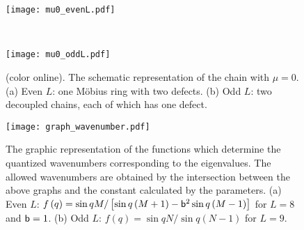 \documentclass[aps, prb, showpacs, twocolumn, %
amssymb,superscriptaddress]{revtex4}
\begin{document}
\begin{figure}[t]
      \begin{minipage}[t]{0.95\hsize}
		\centering
		\texttt{[image: mu0\_evenL.pdf]}
      \end{minipage} \\ 
      \begin{minipage}[t]{0.95\hsize}
		\centering
		\texttt{[image: mu0\_oddL.pdf]}
      \end{minipage}
      \caption{(color online). The schematic representation of the chain with $\mu=0$. (a) Even $L$: one M\"obius ring with two defects. (b) Odd $L$: two decoupled chains, each of which has one defect.}
      \label{fig:mu0}
\end{figure}

\begin{figure}[t]
	\texttt{[image: graph\_wavenumber.pdf]} 
      \caption{The graphic representation of the functions which determine the quantized wavenumbers corresponding to the eigenvalues. The allowed wavenumbers are obtained by the intersection between the above graphs and the constant calculated by the parameters. (a) Even $L$: $f \left( q \right) = \sin qM / \left[ \sin q \left( M+1 \right) - {\sf b}^{2} \sin q \left( M-1 \right) \right]$ for $L=8$ and ${\sf b}=1$. (b) Odd $L$: $f \left( q \right) = \sin qN / \sin q \left( N-1 \right)$ for $L=9$.}
      \label{fig:graph}
\end{figure}
\end{document}
